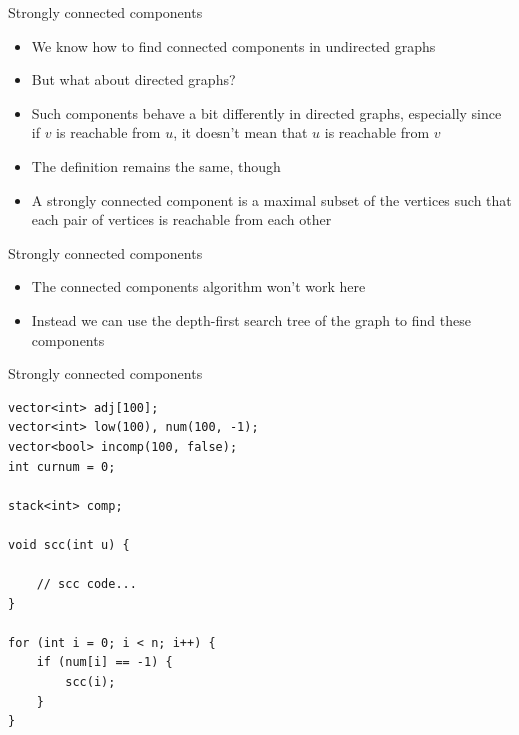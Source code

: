 \documentclass{beamer}
\begin{document}
\begin{frame}[plain]{Strongly connected components}
    \vspace{10pt}
    \begin{itemize}
        \item We know how to find connected components in undirected graphs
        \item But what about directed graphs?
        \vspace{10pt}
        \item Such components behave a bit differently in directed graphs, especially since if $v$ is reachable from $u$, it doesn't mean that $u$ is reachable from $v$
        \vspace{10pt}
        \item The definition remains the same, though
        \item A strongly connected component is a maximal subset of the vertices such that each pair of vertices is reachable from each other
    \end{itemize}
\end{frame}

\begin{frame}[plain]{Strongly connected components}
    \vspace{40pt}
    \begin{itemize}
        \item The connected components algorithm won't work here
        \vspace{10pt}
        \item Instead we can use the depth-first search tree of the graph to find these components
    \end{itemize}
\end{frame}

\begin{frame}{Strongly connected components}
    \begin{verbatim}
vector<int> adj[100];
vector<int> low(100), num(100, -1);
vector<bool> incomp(100, false);
int curnum = 0;

stack<int> comp;

void scc(int u) {

    // scc code...
}

for (int i = 0; i < n; i++) {
    if (num[i] == -1) {
        scc(i);
    }
}
    \end{verbatim}
\end{frame}
\end{document}
